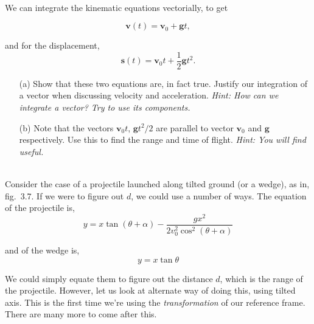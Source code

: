     \begin{exc}
            \begin{exercise}[subtitle={Projectile with Vectors.}, points = 2]
            \smallskip
            ~\\
            We can integrate the kinematic equations vectorially, to get

            \[
            \mathbf{v}(t) = \mathbf{v}_0 + \mathbf{g}t,
            \]
            
            and for the displacement,
            \[
            \mathbf{s}(t) = \mathbf{v}_0 t + \frac{1}{2} \mathbf{g} t^2.
            \]
            
            \begin{enumerate}
                \item[(a)] Show that these two equations are, in fact true. Justify our integration of a vector when 
                discussing velocity and acceleration. \emph{Hint: How can we integrate a vector? Try to use its components.}
            
                \item[(b)] Note that the vectors $\mathbf{v}_0 t$, $\mathbf{g} t^2 / 2$ are parallel to vector $\mathbf{v}_0$ and $\mathbf{g}$ respectively. 
                Use this to find the range and time of flight. \textit{Hint: You will find  useful.}
            \end{enumerate}
        \end{exercise}

        \begin{exercise}[subtitle={Projectile Motion in tilted axes.}, points = 2]
            \smallskip
            ~\\
            Consider the case of a projectile launched along tilted ground (or a wedge), as in, fig.~3.7. 
            If we were to figure out $d$, we could use a number of ways. The equation of the projectile is,
            \[
            y = x \tan(\theta + \alpha) - \frac{g x^2}{2 v_0^2 \cos^2(\theta + \alpha)}
            \]

            and of the wedge is,
            \[
            y = x \tan \theta
            \]

            We could simply equate them to figure out the distance $d$, which is the range of the projectile. 
            However, let us look at alternate way of doing this, using tilted axis. This is the first time 
            we're using the \emph{transformation} of our reference frame. There are many more to come after this.


\end{exercise}
\end{exc}
